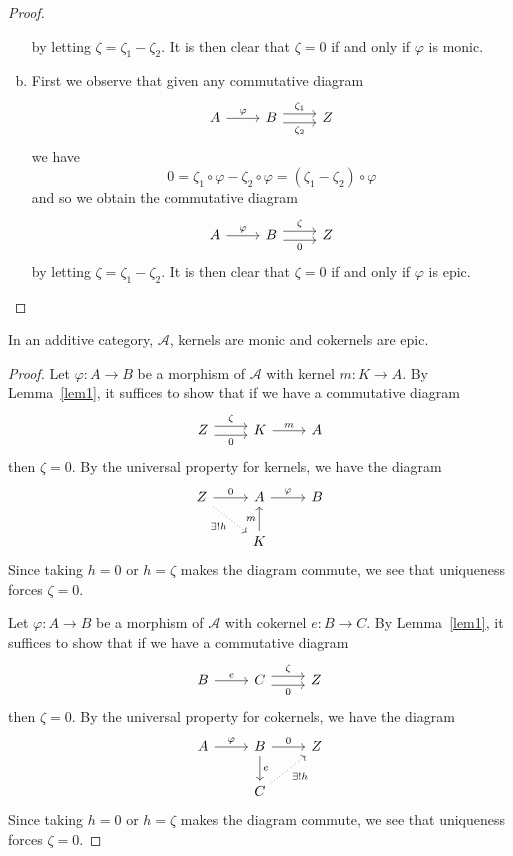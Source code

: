\documentclass[10pt]{amsart}
\begin{document}
\begin{lem}
\begin{proof}
\begin{enumerate}[(a)]
      by letting $\zeta = \zeta_1 - \zeta_2$.
      It is then clear that $\zeta = 0$ if and only if $\varphi$ is monic.
    \item
      First we observe that given any commutative diagram
      $$\begin{tikzcd}
	A\arrow{r}{\varphi} & B \arrow[shift left = 0.75ex]{r}{\zeta_1} \arrow[shift right=0.75ex, swap]{r}{\zeta_2}& Z
      \end{tikzcd}$$
      we have
      $$0 = \zeta_1 \circ \varphi - \zeta_2 \circ \varphi = (\zeta_1 - \zeta_2) \circ \varphi $$
      and so we obtain the commutative diagram
      $$\begin{tikzcd}
	A\arrow{r}{\varphi} & B \arrow[shift left = 0.75ex]{r}{\zeta} \arrow[shift right=0.75ex, swap]{r}{0} & Z
      \end{tikzcd}$$
      by letting $\zeta = \zeta_1 - \zeta_2$.
      It is then clear that $\zeta = 0$ if and only if $\varphi$ is epic.
    \end{enumerate}
  \end{proof}
\end{lem}

\begin{lem}\label{lem2}
  In an additive category, $\mathcal{A}$, kernels are monic and cokernels are epic.
  \begin{proof}
    Let $\varphi : A \rightarrow B$ be a morphism of $\mathcal{A}$ with kernel $m : K \rightarrow A$.
    By Lemma~\ref{lem1}, it suffices to show that if we have a commutative diagram
    $$\begin{tikzcd}
      Z \arrow[shift left = 0.75ex]{r}{\zeta} \arrow[shift right=0.75ex, swap]{r}{0}& K\arrow{r}{m} & A
    \end{tikzcd}$$
    then $\zeta = 0$.
    By the universal property for kernels, we have the diagram
    $$\begin{tikzcd}
      Z \arrow{r}{0} \arrow[dotted,swap]{rd}{\exists ! h}& A \arrow{r}{\varphi} & B\\
      & K \arrow{u}{m}
    \end{tikzcd}$$
    Since taking $h= 0 $ or $h = \zeta$ makes the diagram commute, we see that uniqueness forces $\zeta = 0$.
    
    Let $\varphi : A \rightarrow B$ be a morphism of $\mathcal{A}$ with cokernel $e : B \rightarrow C$.
    By Lemma~\ref{lem1}, it suffices to show that if we have a commutative diagram
    $$\begin{tikzcd}
      B\arrow{r}{e} & C \arrow[shift left = 0.75ex]{r}{\zeta} \arrow[shift right=0.75ex, swap]{r}{0} & Z
    \end{tikzcd}$$
    then $\zeta = 0$.
    By the universal property for cokernels, we have the diagram
    $$\begin{tikzcd}
      A \arrow{r}{\varphi} & B \arrow{d}{e}\arrow{r}{0} & Z\\
      & C \arrow[dotted,swap]{ur}{\exists ! h}
    \end{tikzcd}$$
    Since taking $h= 0 $ or $h = \zeta$ makes the diagram commute, we see that uniqueness forces $\zeta = 0$.
  \end{proof}
\end{lem}
\end{document}
